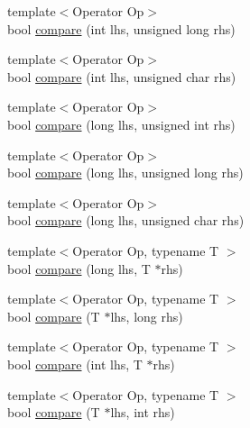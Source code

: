 \begin{DoxyCompactItemize}
\item 
{\footnotesize template$<$Operator Op$>$ }\\bool \hyperlink{namespace_catch_1_1_internal_aac7a6452ed0d324031ceb7b4f3a3b61c}{compare} (int lhs, unsigned long rhs)
\item 
{\footnotesize template$<$Operator Op$>$ }\\bool \hyperlink{namespace_catch_1_1_internal_a7e82d987f62b9822107027c72a55fa6b}{compare} (int lhs, unsigned char rhs)
\item 
{\footnotesize template$<$Operator Op$>$ }\\bool \hyperlink{namespace_catch_1_1_internal_a0b4783ede1901e5c1baf8ff909bcce8d}{compare} (long lhs, unsigned int rhs)
\item 
{\footnotesize template$<$Operator Op$>$ }\\bool \hyperlink{namespace_catch_1_1_internal_ae9aec44a08d9cbb0d3dd46d438b50d2c}{compare} (long lhs, unsigned long rhs)
\item 
{\footnotesize template$<$Operator Op$>$ }\\bool \hyperlink{namespace_catch_1_1_internal_a79664b5f5f497fba57bd156e098de1f2}{compare} (long lhs, unsigned char rhs)
\item 
{\footnotesize template$<$Operator Op, typename T $>$ }\\bool \hyperlink{namespace_catch_1_1_internal_a829570ad9e724c687aa42190a696032b}{compare} (long lhs, T $\ast$rhs)
\item 
{\footnotesize template$<$Operator Op, typename T $>$ }\\bool \hyperlink{namespace_catch_1_1_internal_a3f89c65fdb06aa7b648c5acf0ca107a9}{compare} (T $\ast$lhs, long rhs)
\item 
{\footnotesize template$<$Operator Op, typename T $>$ }\\bool \hyperlink{namespace_catch_1_1_internal_a4f30c29e4adb62c7e209e5b988e59397}{compare} (int lhs, T $\ast$rhs)
\item 
{\footnotesize template$<$Operator Op, typename T $>$ }\\bool \hyperlink{namespace_catch_1_1_internal_a95361ddae55c9a390e6510bdadccb1fc}{compare} (T $\ast$lhs, int rhs)
\end{DoxyCompactItemize}


